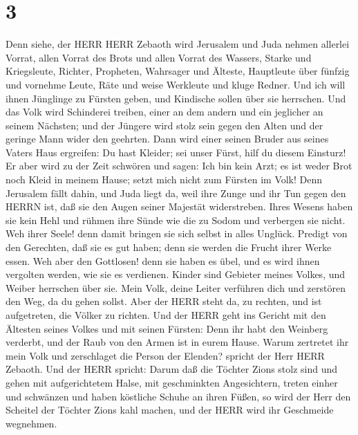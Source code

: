 \hypertarget{section-2}{%
\section{3}\label{section-2}}

 Denn siehe, der HERR HERR Zebaoth wird Jerusalem und Juda
nehmen allerlei Vorrat, allen Vorrat des Brots und allen Vorrat des
Wassers,  Starke und Kriegsleute, Richter, Propheten,
Wahrsager und Älteste,  Hauptleute über fünfzig und vornehme
Leute, Räte und weise Werkleute und kluge Redner.  Und ich
will ihnen Jünglinge zu Fürsten geben, und Kindische sollen über sie
herrschen.  Und das Volk wird Schinderei treiben, einer an
dem andern und ein jeglicher an seinem Nächsten; und der Jüngere wird
stolz sein gegen den Alten und der geringe Mann wider den geehrten.
 Dann wird einer seinen Bruder aus seines Vaters Haus
ergreifen: Du hast Kleider; sei unser Fürst, hilf du diesem Einsturz!
 Er aber wird zu der Zeit schwören und sagen: Ich bin kein
Arzt; es ist weder Brot noch Kleid in meinem Hause; setzt mich nicht zum
Fürsten im Volk!  Denn Jerusalem fällt dahin, und Juda liegt
da, weil ihre Zunge und ihr Tun gegen den HERRN ist, daß sie den Augen
seiner Majestät widerstreben.  Ihres Wesens haben sie kein
Hehl und rühmen ihre Sünde wie die zu Sodom und verbergen sie nicht. Weh
ihrer Seele! denn damit bringen sie sich selbst in alles Unglück.
 Predigt von den Gerechten, daß sie es gut haben; denn sie
werden die Frucht ihrer Werke essen.  Weh aber den
Gottlosen! denn sie haben es übel, und es wird ihnen vergolten werden,
wie sie es verdienen.  Kinder sind Gebieter meines Volkes,
und Weiber herrschen über sie. Mein Volk, deine Leiter verführen dich
und zerstören den Weg, da du gehen sollst.  Aber der HERR
steht da, zu rechten, und ist aufgetreten, die Völker zu richten.
 Und der HERR geht ins Gericht mit den Ältesten seines
Volkes und mit seinen Fürsten: Denn ihr habt den Weinberg verderbt, und
der Raub von den Armen ist in eurem Hause.  Warum zertretet
ihr mein Volk und zerschlaget die Person der Elenden? spricht der Herr
HERR Zebaoth.  Und der HERR spricht: Darum daß die Töchter
Zions stolz sind und gehen mit aufgerichtetem Halse, mit geschminkten
Angesichtern, treten einher und schwänzen und haben köstliche Schuhe an
ihren Füßen,  so wird der Herr den Scheitel der Töchter
Zions kahl machen, und der HERR wird ihr Geschmeide wegnehmen.

